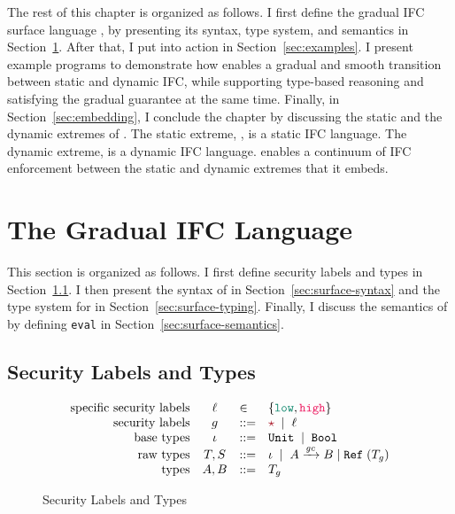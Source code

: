 The rest of this chapter is organized as follows. I first define the gradual IFC
surface language \Surface, by presenting its syntax, type system, and semantics
in Section~\ref{sec:surface-def}. After that, I put \Surface into action in
Section~\ref{sec:examples}. I present example programs to demonstrate how
\Surface enables a gradual and smooth transition between static and dynamic IFC,
while supporting type-based reasoning and satisfying the gradual guarantee at
the same time. Finally, in Section~\ref{sec:embedding}, I conclude the chapter
by discussing the static and the dynamic extremes of \Surface. The static
extreme, \SSLRef, is a static IFC language. The dynamic extreme, \DynIFC is a
dynamic IFC language. \Surface enables a continuum of IFC enforcement between
the static and dynamic extremes that it embeds.

\section{The Gradual IFC Language \Surface}
\label{sec:surface-def}

This section is organized as follows. I first define security labels and types
in Section~\ref{sec:labels-and-types}. I then present the syntax of \Surface in
Section~\ref{sec:surface-syntax} and the type system for \Surface in
Section~\ref{sec:surface-typing}. Finally, I discuss the semantics of \Surface
by defining \texttt{eval} in Section~\ref{sec:surface-semantics}.

\subsection{Security Labels and Types}
\label{sec:labels-and-types}

\begin{figure}[tbp]
\raggedright
  {\small
  \[
  \begin{array}{rcll}
    \text{specific security labels} & \ell & \in & \{ \low , \high \} \\
    \text{security labels}  & g    & ::= & \unk \MID \ell \\
    \text{base types}               & \iota     & ::= & \Unit \MID \Bool \\
    \text{raw types}                & T, S      & ::= & \iota \MID \Fun{A}{\gc}{B} \mid \Refer{(T_g)} \\
    \text{types}                    & A, B      & ::= & T_g \\
  \end{array}
  \]}
  \caption{Security Labels and Types}
  \label{fig:labels-and-types}
\end{figure}

